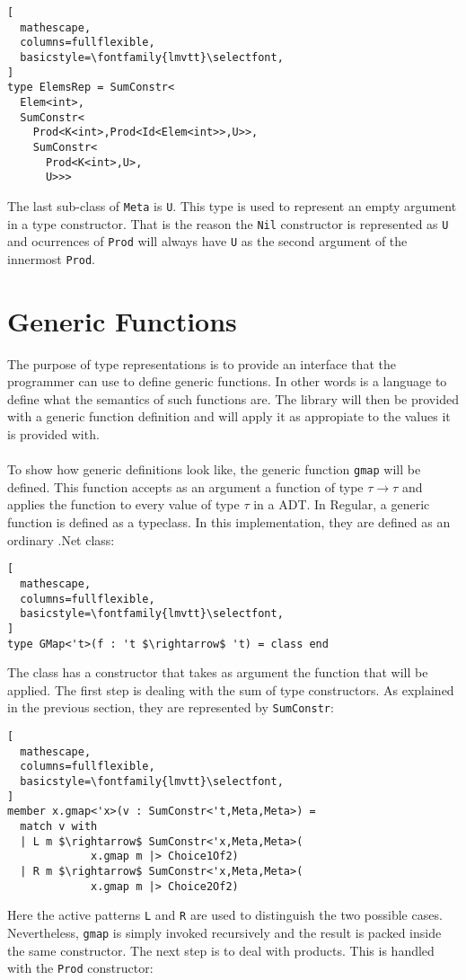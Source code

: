 \documentclass{sigplanconf}
\begin{document}
\begin{lstlisting}[
  mathescape,
  columns=fullflexible,
  basicstyle=\fontfamily{lmvtt}\selectfont,
]
type ElemsRep = SumConstr<
  Elem<int>,
  SumConstr<
    Prod<K<int>,Prod<Id<Elem<int>>,U>>,
    SumConstr<
      Prod<K<int>,U>,
      U>>>
\end{lstlisting}
The last sub-class of \verb+Meta+ is \verb+U+. This type is used to represent an empty argument in a type constructor. That is the reason the \verb+Nil+ constructor is represented as \verb+U+ and ocurrences of \verb+Prod+ will always have \verb+U+ as the second argument of the innermost \verb+Prod+.
\section{Generic Functions}
The purpose of type representations is to provide an interface that the programmer can use to define generic functions. In other words is a language to define what the semantics of such functions are. The library will then be provided with a generic function definition and will apply it as appropiate to the values it is provided with.
\\\\
To show how generic definitions look like, the generic function \verb+gmap+ will be defined. This function accepts as an argument a function of type $\tau\to\tau$ and applies the function to every value of type $\tau$ in a ADT. In Regular, a generic function is defined as a typeclass. In this implementation, they are defined as an ordinary .Net class:
\begin{lstlisting}[
  mathescape,
  columns=fullflexible,
  basicstyle=\fontfamily{lmvtt}\selectfont,
]
type GMap<'t>(f : 't $\rightarrow$ 't) = class end
\end{lstlisting}
The class has a constructor that takes as argument the function that will be applied. The first step is dealing with the sum of type constructors. As explained in the previous section, they are represented by \verb+SumConstr+:
\begin{lstlisting}[
  mathescape,
  columns=fullflexible,
  basicstyle=\fontfamily{lmvtt}\selectfont,
]
member x.gmap<'x>(v : SumConstr<'t,Meta,Meta>) =
  match v with
  | L m $\rightarrow$ SumConstr<'x,Meta,Meta>(
             x.gmap m |> Choice1Of2)
  | R m $\rightarrow$ SumConstr<'x,Meta,Meta>(
             x.gmap m |> Choice2Of2)
\end{lstlisting}
Here the active patterns \verb+L+ and \verb+R+ are used to distinguish the two possible cases. Nevertheless, \verb+gmap+ is simply invoked recursively and the result is packed inside the same constructor. The next step is to deal with products. This is handled with the \verb+Prod+ constructor:
\end{document}
